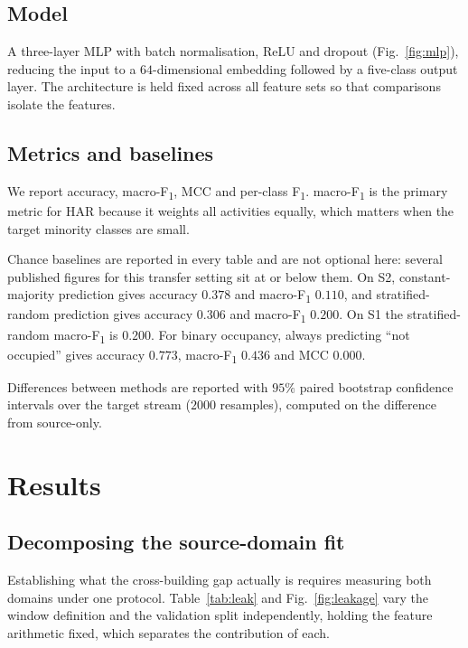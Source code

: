 \documentclass[a4paper,fleqn]{cas-dc}
\newcommand{\macf}{macro-F\textsubscript{1}}
\begin{document}
\subsection{Model}

A three-layer MLP with batch normalisation, ReLU and dropout (Fig.~\ref{fig:mlp}),
reducing the input to a $64$-dimensional embedding followed by a five-class output layer. The architecture is held
fixed across all feature sets so that comparisons isolate the features.

\subsection{Metrics and baselines}

We report accuracy, \macf, MCC \cite{chicco2020} and per-class F\textsubscript{1}. \macf{} is the primary
metric for HAR because it weights all activities equally, which matters when the target
minority classes are small.

Chance baselines are reported in every table and are not optional here: several published
figures for this transfer setting sit at or below them. On S2, constant-majority
prediction gives accuracy $0.378$ and \macf{} $0.110$, and stratified-random prediction
gives accuracy $0.306$ and \macf{} $\mathbf{0.200}$. On S1 the stratified-random \macf{} is
$0.200$. For binary occupancy, always predicting ``not occupied'' gives accuracy $0.773$,
\macf{} $0.436$ and MCC $0.000$.

Differences between methods are reported with $95\%$ paired bootstrap confidence
intervals over the target stream ($2000$ resamples), computed on the difference from
source-only.

\section{Results}
\label{sec:results}

\subsection{Decomposing the source-domain fit}
\label{sec:res-leak}

Establishing what the cross-building gap actually is requires measuring both domains
under one protocol. Table~\ref{tab:leak} and Fig.~\ref{fig:leakage} vary the window
definition and the validation split independently, holding the feature arithmetic fixed,
which separates the contribution of each.
\end{document}
